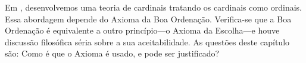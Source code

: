 \documentclass[../../../include/open-logic-section]{subfiles}
\begin{document}


Em ,
desenvolvemos uma teoria de cardinais tratando os cardinais como ordinais.
Essa abordagem depende do Axioma da Boa Ordenação. Verifica-se
que a Boa Ordenação é equivalente a outro princípio---o Axioma da
Escolha---e houve discussão filosófica séria sobre a sua
aceitabilidade. As questões deste capítulo são: Como é que o Axioma é
usado, e pode ser justificado?
\end{document}
